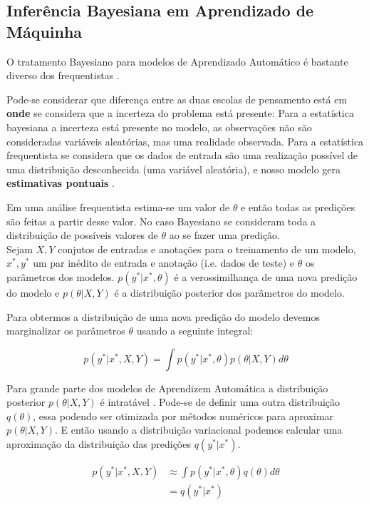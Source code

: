 \subsection{Inferência Bayesiana em Aprendizado de Máquinha}
\label{sec:bayesinf}
O tratamento Bayesiano para modelos de Aprendizado Automático é bastante diverso dos frequentistas \citep{dlbook}.

Pode-se considerar que diferença entre as duas escolas de pensamento está em
\textbf{onde} se considera que a incerteza do problema está presente: Para a
estatística bayesiana a incerteza está presente no modelo, as observações não
são consideradas variáveis aleatórias, mas uma realidade observada. Para a estatística frequentista
se considera que os dados de entrada são uma realização possível de uma
distribuição desconhecida (uma variável aleatória), e nosso modelo gera \textbf{estimativas pontuais} \citep{rethink}.

Em uma análise frequentista estima-se um valor de $\theta$ e então todas as
predições são feitas a partir desse valor. No caso Bayesiano se consideram toda
a distribuição de possíveis valores de $\theta$ ao se fazer uma predição. \\ 


Sejam $X,Y$ conjutos de entradas e anotações para o treinamento de um modelo,
$x^*,y^*$ um par inédito de entrada e anotação (i.e. dados de teste) e
$\theta$ os parâmetros dos modelos. $p(y^* | x^*,\theta)$ é a verossimilhança de
uma nova predição do modelo e $p(\theta | X,Y)$ é a distribuição posterior dos
parâmetros do modelo.

Para obtermos a distribuição de uma nova
predição do modelo devemos marginalizar os parâmetros $\theta$ usando a seguinte integral:

\begin{equation}
  \label{eq:int}
  p(y^* | x^* , X,Y) = \int  p(y^* | x^*,\theta) p(\theta | X,Y)  d\theta 
\end{equation}

Para grande parte dos modelos de Aprendizem Automática a distribuição posterior
$p(\theta | X,Y)$ é intratável \citep{ubertime}. Pode-se de definir uma outra
distribuição $q(\theta)$, essa podendo ser otimizada por métodos numéricos para
aproximar $p(\theta | X,Y)$. E então usando a distribuição variacional podemos
calcular uma aproximação da distribuição das predições $q(y^*|x^*)$. 

\begin{align*}
  \label {eq:pq}
    p(y^* | x^* , X,Y) &\approx \int  p(y^* | x^*,\theta) q(\theta)d\theta \\
                       &= q(y^* | x^*)
\end{align*}

